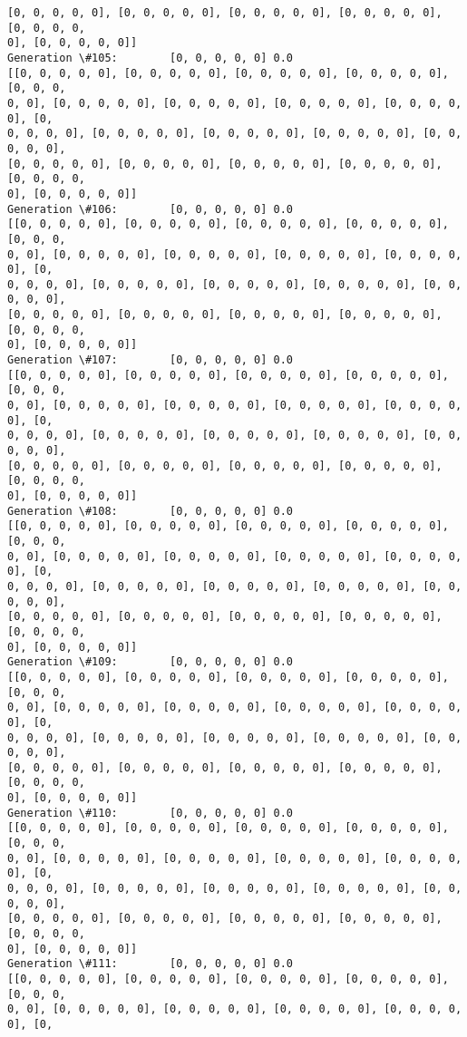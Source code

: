 \documentclass[11pt]{article}
\begin{document}
\begin{Verbatim}[commandchars=\\\{\}]
[0, 0, 0, 0, 0], [0, 0, 0, 0, 0], [0, 0, 0, 0, 0], [0, 0, 0, 0, 0], [0, 0, 0, 0,
0], [0, 0, 0, 0, 0]]
Generation \#105:        [0, 0, 0, 0, 0] 0.0
[[0, 0, 0, 0, 0], [0, 0, 0, 0, 0], [0, 0, 0, 0, 0], [0, 0, 0, 0, 0], [0, 0, 0,
0, 0], [0, 0, 0, 0, 0], [0, 0, 0, 0, 0], [0, 0, 0, 0, 0], [0, 0, 0, 0, 0], [0,
0, 0, 0, 0], [0, 0, 0, 0, 0], [0, 0, 0, 0, 0], [0, 0, 0, 0, 0], [0, 0, 0, 0, 0],
[0, 0, 0, 0, 0], [0, 0, 0, 0, 0], [0, 0, 0, 0, 0], [0, 0, 0, 0, 0], [0, 0, 0, 0,
0], [0, 0, 0, 0, 0]]
Generation \#106:        [0, 0, 0, 0, 0] 0.0
[[0, 0, 0, 0, 0], [0, 0, 0, 0, 0], [0, 0, 0, 0, 0], [0, 0, 0, 0, 0], [0, 0, 0,
0, 0], [0, 0, 0, 0, 0], [0, 0, 0, 0, 0], [0, 0, 0, 0, 0], [0, 0, 0, 0, 0], [0,
0, 0, 0, 0], [0, 0, 0, 0, 0], [0, 0, 0, 0, 0], [0, 0, 0, 0, 0], [0, 0, 0, 0, 0],
[0, 0, 0, 0, 0], [0, 0, 0, 0, 0], [0, 0, 0, 0, 0], [0, 0, 0, 0, 0], [0, 0, 0, 0,
0], [0, 0, 0, 0, 0]]
Generation \#107:        [0, 0, 0, 0, 0] 0.0
[[0, 0, 0, 0, 0], [0, 0, 0, 0, 0], [0, 0, 0, 0, 0], [0, 0, 0, 0, 0], [0, 0, 0,
0, 0], [0, 0, 0, 0, 0], [0, 0, 0, 0, 0], [0, 0, 0, 0, 0], [0, 0, 0, 0, 0], [0,
0, 0, 0, 0], [0, 0, 0, 0, 0], [0, 0, 0, 0, 0], [0, 0, 0, 0, 0], [0, 0, 0, 0, 0],
[0, 0, 0, 0, 0], [0, 0, 0, 0, 0], [0, 0, 0, 0, 0], [0, 0, 0, 0, 0], [0, 0, 0, 0,
0], [0, 0, 0, 0, 0]]
Generation \#108:        [0, 0, 0, 0, 0] 0.0
[[0, 0, 0, 0, 0], [0, 0, 0, 0, 0], [0, 0, 0, 0, 0], [0, 0, 0, 0, 0], [0, 0, 0,
0, 0], [0, 0, 0, 0, 0], [0, 0, 0, 0, 0], [0, 0, 0, 0, 0], [0, 0, 0, 0, 0], [0,
0, 0, 0, 0], [0, 0, 0, 0, 0], [0, 0, 0, 0, 0], [0, 0, 0, 0, 0], [0, 0, 0, 0, 0],
[0, 0, 0, 0, 0], [0, 0, 0, 0, 0], [0, 0, 0, 0, 0], [0, 0, 0, 0, 0], [0, 0, 0, 0,
0], [0, 0, 0, 0, 0]]
Generation \#109:        [0, 0, 0, 0, 0] 0.0
[[0, 0, 0, 0, 0], [0, 0, 0, 0, 0], [0, 0, 0, 0, 0], [0, 0, 0, 0, 0], [0, 0, 0,
0, 0], [0, 0, 0, 0, 0], [0, 0, 0, 0, 0], [0, 0, 0, 0, 0], [0, 0, 0, 0, 0], [0,
0, 0, 0, 0], [0, 0, 0, 0, 0], [0, 0, 0, 0, 0], [0, 0, 0, 0, 0], [0, 0, 0, 0, 0],
[0, 0, 0, 0, 0], [0, 0, 0, 0, 0], [0, 0, 0, 0, 0], [0, 0, 0, 0, 0], [0, 0, 0, 0,
0], [0, 0, 0, 0, 0]]
Generation \#110:        [0, 0, 0, 0, 0] 0.0
[[0, 0, 0, 0, 0], [0, 0, 0, 0, 0], [0, 0, 0, 0, 0], [0, 0, 0, 0, 0], [0, 0, 0,
0, 0], [0, 0, 0, 0, 0], [0, 0, 0, 0, 0], [0, 0, 0, 0, 0], [0, 0, 0, 0, 0], [0,
0, 0, 0, 0], [0, 0, 0, 0, 0], [0, 0, 0, 0, 0], [0, 0, 0, 0, 0], [0, 0, 0, 0, 0],
[0, 0, 0, 0, 0], [0, 0, 0, 0, 0], [0, 0, 0, 0, 0], [0, 0, 0, 0, 0], [0, 0, 0, 0,
0], [0, 0, 0, 0, 0]]
Generation \#111:        [0, 0, 0, 0, 0] 0.0
[[0, 0, 0, 0, 0], [0, 0, 0, 0, 0], [0, 0, 0, 0, 0], [0, 0, 0, 0, 0], [0, 0, 0,
0, 0], [0, 0, 0, 0, 0], [0, 0, 0, 0, 0], [0, 0, 0, 0, 0], [0, 0, 0, 0, 0], [0,

\end{Verbatim}
\end{document}
